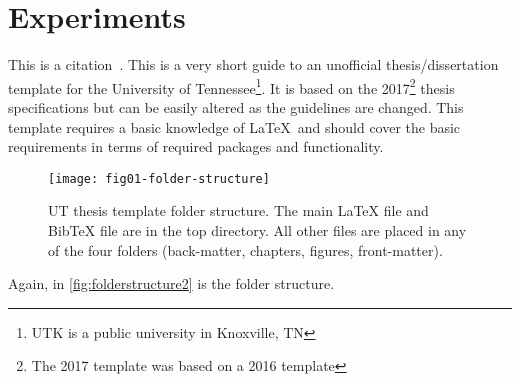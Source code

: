 \chapter{Experiments} \label{chapter2}

This is a citation~\cite{utk:idr2016optimization}.
This is a very short guide to an unofficial thesis/dissertation template
for the University of Tennessee\footnote{UTK is a public university in Knoxville,
TN}.
It is based on the 2017\footnote{The 2017 template was based on a 2016 template} thesis specifications but can be easily altered
as the guidelines are changed.
This template requires a basic knowledge of \LaTeX\ and should cover
the basic requirements in terms of required packages and functionality.

\begin{figure}[!htb]
    \Centering
    \texttt{[image: fig01-folder-structure]}
    \caption[UT thesis template folder structure]{UT thesis template folder structure.
        The main LaTeX file and BibTeX file are in the top directory.
        All other files are placed in any of the four folders
        (back-matter, chapters, figures, front-matter).}
    \label{fig:folderstructure2}
\end{figure}

Again, in \autoref{fig:folderstructure2} is the folder structure.

